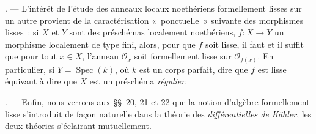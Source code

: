 \begin{env}[19.0.2]
\medskip\noindentIV. --- L'intérêt de l'étude des anneaux locaux
noethériens formellement lisses sur un autre provient de la caractérisation
«~ponctuelle~» suivante des morphismes lisses~: si $X$ et $Y$ sont des
préschémas localement noethériens, $f:X\to Y$ un morphisme localement de type
fini, alors, pour que $f$ soit lisse, il faut et il suffit que pour tout
$x\in X$, l'anneau $\mathcal O_x$ soit formellement lisse sur
$\mathcal O_{f(x)}$. En particulier, si $Y=\operatorname{Spec}(k)$, où $k$ est
un corps parfait, dire que $f$ est lisse équivaut à dire que $X$ est un
préschéma \emph{régulier}.

\medskip\noindentV. --- Enfin, nous verrons aux §§~20, 21 et 22 que
la notion d'algèbre formellement lisse s'introduit de façon naturelle dans la
théorie des \emph{différentielles de Kähler}, les deux théories s'éclairant
mutuellement.
\end{env}

